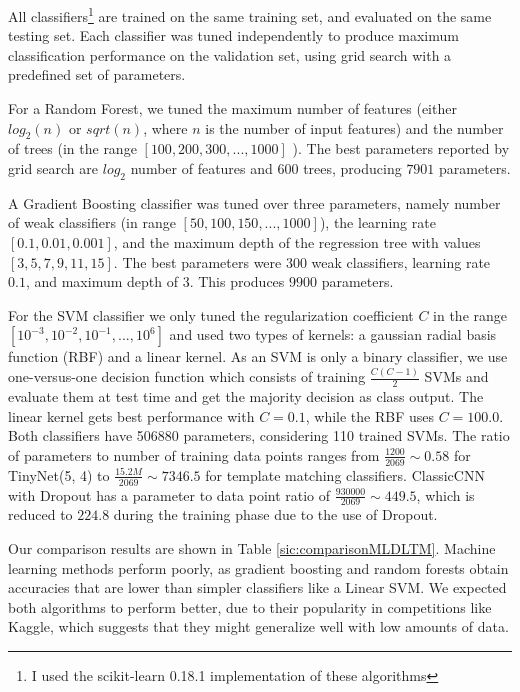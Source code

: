 All classifiers\footnote{I used the scikit-learn 0.18.1 implementation of these algorithms} are trained on the same training set, and evaluated on the same testing set. Each classifier was tuned independently to produce maximum classification performance on the validation set, using grid search with a predefined set of parameters.

For a Random Forest, we tuned the maximum number of features (either $log_2(n)$ or $sqrt(n)$, where $n$ is the number of input features) and the number of trees (in the range $[100, 200, 300, ..., 1000]$ ). The best parameters reported by grid search are $log_2$ number of features and 600 trees, producing $7901$ parameters.

A Gradient Boosting \cite{murphy2012machine} classifier was tuned over three parameters, namely number of weak classifiers (in range $[50, 100, 150, ..., 1000]$), the learning rate $[0.1, 0.01, 0.001]$, and the maximum depth of the regression tree with values $[3, 5, 7, 9, 11, 15]$. The best parameters were $300$ weak classifiers, learning rate $0.1$, and maximum depth of $3$. This produces $9900$ parameters.

For the SVM classifier we only tuned the regularization coefficient $C$ in the range $[10^{-3}, 10^{-2}, 10^{-1}, ..., 10^6]$ and used two types of kernels: a gaussian radial basis function (RBF) and a linear kernel. As an SVM is only a binary classifier, we use one-versus-one decision function which consists of training $\frac{C (C - 1)}{2}$ SVMs and evaluate them at test time and get the majority decision as class output. The linear kernel gets best performance with $C = 0.1$, while the RBF uses $C = 100.0$. Both classifiers have 506880 parameters, considering 110 trained SVMs. The ratio of parameters to number of training data points ranges from $\frac{1200}{2069} \sim 0.58$ for TinyNet(5, 4) to $\frac{15.2 M}{2069} \sim 7346.5$ for template matching classifiers. ClassicCNN with Dropout has a parameter to data point ratio of $\frac{930000}{2069} \sim 449.5$, which is reduced to $224.8$ during the training phase due to the use of Dropout.

Our comparison results are shown in Table \ref{sic:comparisonMLDLTM}. Machine learning methods perform poorly, as gradient boosting and random forests obtain accuracies that are lower than simpler classifiers like a Linear SVM. We expected both algorithms to perform better, due to their popularity in competitions like Kaggle, which suggests that they might generalize well with low amounts of data.

